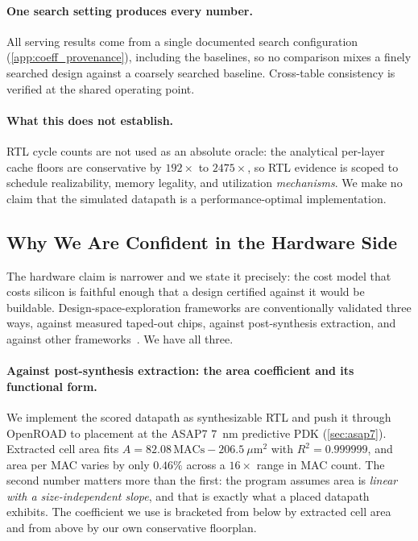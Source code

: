 \paragraph{One search setting produces every number.}
All serving results come from a single documented search configuration
(\cref{app:coeff_provenance}), including the baselines, so no comparison mixes a
finely searched design against a coarsely searched baseline. Cross-table
consistency is verified at the shared operating point.

\paragraph{What this does not establish.}
RTL cycle counts are not used as an absolute oracle: the analytical per-layer
cache floors are conservative by $192\times$ to $2475\times$, so RTL evidence is
scoped to schedule realizability, memory legality, and utilization
\emph{mechanisms}. We make no claim that the simulated datapath is a
performance-optimal implementation.

\subsection{Why We Are Confident in the Hardware Side}
\label{app:hw_confidence}

The hardware claim is narrower and we state it precisely: the cost model that
costs silicon is faithful enough that a design certified against it would be
buildable. Design-space-exploration frameworks are conventionally validated
three ways, against measured taped-out chips, against post-synthesis extraction,
and against other frameworks~\citep{mei2021zigzag}. We have all three.

\paragraph{Against post-synthesis extraction: the area coefficient and its
functional form.}
We implement the scored datapath as synthesizable RTL and push it through
OpenROAD to placement at the ASAP7 $7$~nm predictive PDK
(\cref{sec:asap7}). Extracted cell area fits
$A = 82.08\,\mathrm{MACs} - 206.5\ \mu\mathrm{m}^2$ with $R^2 = 0.999999$, and
area per MAC varies by only $0.46\%$ across a $16\times$ range in MAC count. The
second number matters more than the first: the program assumes area is
\emph{linear with a size-independent slope}, and that is exactly what a placed
datapath exhibits. The coefficient we use is bracketed from below by extracted
cell area and from above by our own conservative floorplan.


